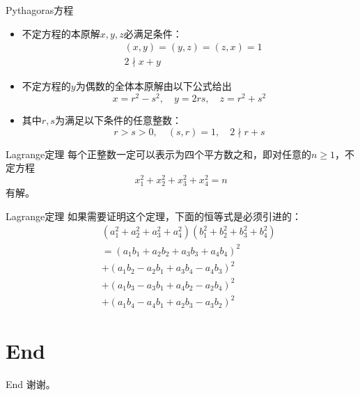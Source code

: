 \documentclass[dvipdfmx]{beamer}
\begin{document}
\begin{frame}{Pythagoras方程}
\begin{itemize}
\item 不定方程的本原解$x,y,z$必满足条件：
\begin{eqnarray*}
&(x,y)=(y,z)=(z,x)=1\\
&2\nmid x+y
\end{eqnarray*}
\pause
\item 不定方程的$y$为偶数的全体本原解由以下公式给出
\begin{displaymath}
x=r^2-s^2,\quad y=2rs,\quad z=r^2+s^2
\end{displaymath}
\item 其中$r,s$为满足以下条件的任意整数：
\begin{displaymath}
r>s>0,\quad (s,r)=1,\quad 2\nmid r+s
\end{displaymath}
\end{itemize}
\end{frame}

\begin{frame}{Lagrange定理}
每个正整数一定可以表示为四个平方数之和，即对任意的$n\geq 1$，不定方程
\begin{displaymath}
x_1^2+x_2^2+x_3^2+x_4^2=n
\end{displaymath}
有解。
\end{frame}

\begin{frame}{Lagrange定理}
如果需要证明这个定理，下面的恒等式是必须引进的：
\begin{eqnarray*}
&&(a_1^2+a_2^2+a_3^2+a_4^2)(b_1^2+b_2^2+b_3^2+b_4^2)\\
&&=(a_1b_1+a_2b_2+a_3b_3+a_4b_4)^2\\
&&+(a_1b_2-a_2b_1+a_3b_4-a_4b_3)^2\\
&&+(a_1b_3-a_3b_1+a_4b_2-a_2b_4)^2\\
&&+(a_1b_4-a_4b_1+a_2b_3-a_3b_2)^2
\end{eqnarray*}
\end{frame}

\section{End}

\begin{frame}{End}
谢谢。
\end{frame}
\end{document}
